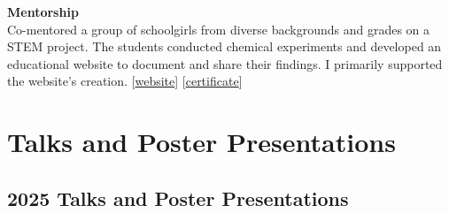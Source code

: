 \documentclass[11pt,a4paper,sans]{moderncv}        %
\begin{document}
\textbf{Mentorship}\\
Co-mentored a group of schoolgirls from diverse backgrounds and grades on a STEM project. 
The students conducted chemical experiments and developed an educational website to document and share their findings. 
I primarily supported the website's creation.  
[\href{https://artomaranjyan.github.io/cheminno/}{website}] [\textcolor{accent}{\href{https://artomaranjyan.github.io/assets/pdf/feminno_certificate.pdf}{certificate}}]

\vspace{5pt}



\section{Talks and Poster Presentations}




\subsection{2025 Talks and Poster Presentations}
\end{document}
